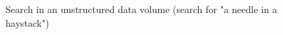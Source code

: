\begin{figure}
\centering



\caption{Search in an unstructured data volume (search for "a needle in a haystack")}
\label{figQuantCompSearch}
\end{figure}